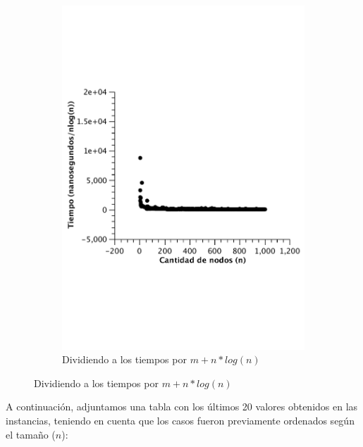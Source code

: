 \begin{figure}[H]
\begin{subfigure}[b]{0.45\textwidth}
                \includegraphics[width=\textwidth]{imagenes/vacio-listas-4.pdf}
                \caption{Dividiendo a los tiempos por $m + n*log(n)$}
        \end{subfigure}
\end{figure}

A continuación, adjuntamos una tabla con los últimos 20 valores obtenidos en las instancias, teniendo en cuenta que los casos fueron previamente ordenados según el tamaño ($n$):


